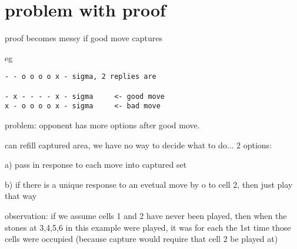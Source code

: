 \section*{problem with proof}
proof becomes messy if good move captures

eg

\begin{verbatim}
- - o o o o x - sigma, 2 replies are

- x - - - - x - sigma     <- good move
x - o o o o x - sigma     <- bad move
\end{verbatim}

problem: opponent has more options after good move.

can refill captured area, we have no way to decide
what to do... 2 options:

a) pass in response to each move
into captured set  

b) if there is a unique response to 
an evetual move by o to cell 2, then just play that way

observation:
if we assume cells 1 and 2 have never been played,
then when the stones at 3,4,5,6 in this example were played,
it was for each the 1st time those cells were occupied
(because capture would require that cell 2 be played at)
